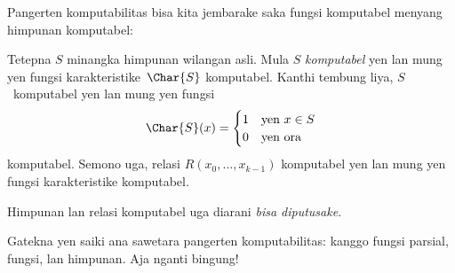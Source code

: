 \documentclass[../../../include/open-logic-section]{subfiles}
\begin{document}

Pangerten komputabilitas bisa kita jembarake
saka fungsi komputabel menyang himpunan komputabel:

\begin{defn}
  Tetepna $S$ minangka himpunan wilangan asli.
  Mula $S$ \emph{komputabel} yen lan mung yen
  fungsi karakteristike~$\Char{S}$ komputabel.
  Kanthi tembung liya, $S$~komputabel yen lan
  mung yen fungsi
\[
\Char{S}(x) =
\begin{cases}
1 & \text{yen $x \in S$} \\
0 & \text{yen ora}
\end{cases}
\]
komputabel. Semono uga, relasi
$R(x_0, \dots, x_{k-1})$ komputabel yen lan
mung yen fungsi karakteristike komputabel.

Himpunan lan relasi komputabel uga diarani
\emph{bisa diputusake}.
\end{defn}

\begin{explain}
Gatekna yen saiki ana sawetara pangerten
komputabilitas: kanggo fungsi parsial, fungsi,
lan himpunan. Aja nganti bingung!{} 
\end{explain}
\end{document}
